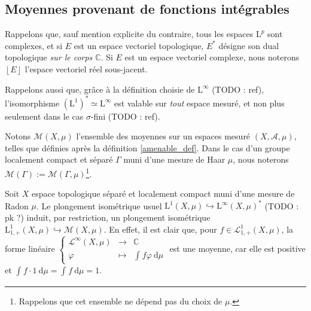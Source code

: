 \documentclass[a4paper,12pt]{article}
\newcommand{\C}{\mathbb{C}}
\newcommand{\norm}[1]{\left\Vert #1\right\Vert}
\newcommand{\floor}[1]{\left\lfloor #1 \right\rfloor}
\newcommand{\integral}[4]{\int_{#1}^{#2} #3~\mathrm{d}#4}
\newcommand\funlam[2]{\left\{\begin{array}{ccc}#1\\#2\end{array}\right.}
\newcommand{\nhds}{\mathcal{N}}
\newcommand{\TODO}[1]{{\color{red}TODO :} #1}
\begin{document}

\subsection{Moyennes provenant de fonctions intégrables}

Rappelons que, sauf mention explicite du contraire, tous les espaces $\mathrm{L}^p$ sont complexes, et
si $E$ est un espace vectoriel topologique, $E^*$ désigne son dual topologique \emph{sur le corps $\C$}. Si
$E$ est un espace vectoriel complexe, nous noterons $\floor{E}$ l'espace vectoriel réel sous-jacent.

Rappelons aussi que, grâce à la définition choisie de $\mathrm{L}^\infty$ (\TODO{ref}), l'isomorphisme $(\mathrm{L}^1)^* \simeq \mathrm{L}^\infty$
est valable sur \emph{tout} espace mesuré, et non plus seulement dans le cas $\sigma$-fini (\TODO{ref}).

Notons $\mathcal{M}(X,\mu)$ l'ensemble des moyennes sur un espaces mesuré $(X,\mathcal{A},\mu)$, telles que définies après la définition \ref{amenable_def}.
Dans le cas d'un groupe localement compact et séparé $\Gamma$ muni d'une mesure de Haar $\mu$, nous noterons
$\mathcal{M}(\Gamma):=\mathcal{M}(\Gamma, \mu)$\footnote{Rappelons que cet ensemble ne dépend pas du choix de $\mu$.}.

Soit $X$ espace topologique séparé et localement compact muni d'une mesure de Radon $\mu$. Le plongement isométrique usuel $\mathrm{L}^1(X,\mu)\hookrightarrow\mathrm{L}^\infty(X,\mu)^*$
(\TODO{pk ?})
induit, par restriction, un plongement isométrique $\mathrm{L}^1_{1, +}(X, \mu)\hookrightarrow \mathcal{M}(X, \mu)$. 
En effet, il est clair que, pour $f\in\mathscr{L}^1_{1, +}(X, \mu)$, la forme linéaire $\funlam{\mathscr{L}^\infty(X,\mu)&\to&\C}{ \varphi &\mapsto&\integral{}{}{f\varphi}{\mu}}$ est une moyenne,
car elle est positive et $\integral{}{}{f\cdot 1}{\mu} = \integral{}{}{f}{\mu} = 1$.
\end{document}
